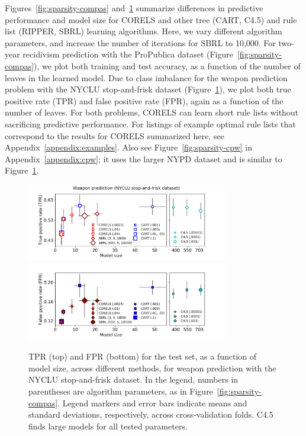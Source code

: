 Figures~\ref{fig:sparsity-compas} and~\ref{fig:sparsity-weapon} summarize differences
in predictive performance and model size
for CORELS and other tree (CART, C4.5) and rule list (RIPPER, SBRL) learning algorithms.
%
Here, we vary different algorithm parameters, and increase the number of iterations for SBRL to 10,000.
%
For two-year recidivism prediction with the ProPublica dataset (Figure~\ref{fig:sparsity-compas}),
we plot both training and test accuracy,
as a function of the number of leaves in the learned model.
%
Due to class imbalance for the weapon prediction problem with the NYCLU stop-and-frisk dataset
(Figure~\ref{fig:sparsity-weapon}), we plot both true positive rate (TPR) and false positive rate (FPR),
again as a function of the number of leaves.
%
For both problems, CORELS can learn short rule lists without sacrificing predictive performance.
%
For listings of example optimal rule lists that correspond to the results
for CORELS summarized here, see Appendix~\ref{appendix:examples}.
%
Also see Figure~\ref{fig:sparsity-cpw} in Appendix~\ref{appendix:cpw}; it uses the larger
NYPD dataset and is similar to Figure~\ref{fig:sparsity-weapon}.

\begin{figure}[t!]
\begin{center}
\includegraphics[trim={17mm, 0mm, 27mm, 0mm},
width=0.78\textwidth]{figs/weapon-sparsity-tpr.pdf}
\includegraphics[trim={17mm, 10mm, 27mm, 4mm},
width=0.78\textwidth]{figs/weapon-sparsity-fpr.pdf}
\end{center}
\caption{TPR (top) and FPR (bottom)
for the test set, as a function of model size, across different methods,
for weapon prediction with the NYCLU stop-and-frisk dataset.
%
In the legend, numbers in parentheses are algorithm parameters,
as in Figure~\ref{fig:sparsity-compas}.
%
Legend markers and error bars indicate means and standard deviations,
respectively, across cross-validation folds.
%
%
C4.5 finds large models for all tested parameters.
}
\label{fig:sparsity-weapon}
\end{figure}

